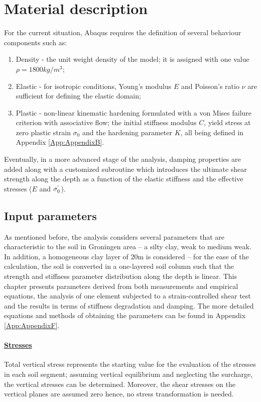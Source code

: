 \documentclass[12pt,a4paper]{report}
\begin{document}
\section{Material description}
For the current situation, Abaqus requires the definition of several behaviour components such as:
\begin{enumerate}
	\item Density - the unit weight density of the model; it is assigned with one value $\rho = 1800 kg/m^3$;
	\item Elastic - for isotropic conditions, Young's modulus $E$ and Poisson's ratio $\nu$ are sufficient for defining the elastic domain;
	\item Plastic - non-linear kinematic hardening formulated with a von Mises failure criterion with associative flow; the initial stiffness modulus $C$, yield stress at zero plastic strain $\sigma_0$ and the hardening parameter $K$, all being defined in Appendix \ref{App:AppendixB}.
\end{enumerate}

	Eventually, in a more advanced stage of the analysis, damping properties are added along with a customized subroutine which introduces the ultimate shear strength along the depth as a function of the elastic stiffness and the effective stresses ($E$ and $\sigma^`_0$).

\subsection{Input parameters}
As mentioned before, the analysis considers several parameters that are characteristic to the soil in Groningen area – a silty clay, weak to medium weak. In addition, a homogeneous clay layer of 20m is considered – for the ease of the calculation, the soil is converted in a one-layered soil column such that the strength and stiffness parameter distribution  along the depth is linear. This chapter presents parameters derived from both measurements and empirical equations, the analysis of one element subjected to a strain-controlled shear test and the results in terms of stiffness degradation and damping. The more detailed equations and methods of obtaining the parameters can be found in Appendix \ref{App:AppendixF}.	

\paragraph{\underline{Stresses}}
Total vertical stress represents the starting value for the evaluation of the stresses in each soil segment; assuming vertical equilibrium and neglecting the surcharge, the vertical stresses can be determined. Moreover, the shear stresses on the vertical planes are assumed zero hence, no stress transformation is needed.
\end{document}
